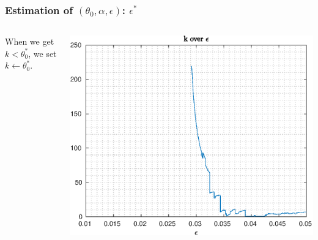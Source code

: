 \documentclass[aspectratio=169]{beamer}\usepackage[utf8]{inputenc}
\begin{document}
\begin{frame}\frametitle{Estimation of $(\theta_0,\alpha,\epsilon)$: $\epsilon^*$}

\begin{columns}

When we get $k<\theta^*_0$, we set $k\gets\theta_0^*$.

\includegraphics[width=1\textwidth]{../../MATLAB_Files/Results/epsilon/theta_over_eps.eps}
\end{columns}

\end{frame}
\end{document}
